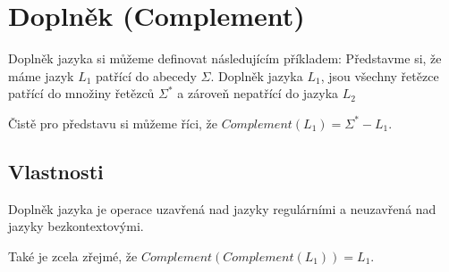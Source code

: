 \section{Doplněk (Complement)}
Doplněk jazyka si můžeme definovat následujícím příkladem:
Představme si, že máme jazyk $L_{1}$ patřící do abecedy $\Sigma$. Doplněk jazyka $L_{1}$, jsou všechny řetězce patřící do množiny řetězců $\Sigma^{*}$ a zároveň nepatřící do jazyka $L_{2}$

Čistě pro představu si můžeme říci, že $Complement(L_{1})=\Sigma^{*} - L_{1}$.

\subsection{Vlastnosti}
Doplněk jazyka je operace uzavřená nad jazyky regulárními a neuzavřená nad jazyky bezkontextovými.

Také je zcela zřejmé, že $Complement(Complement(L_{1})) = L_{1}$.